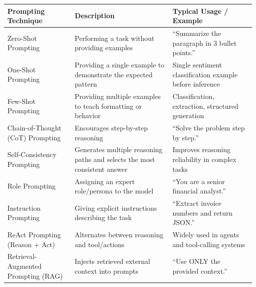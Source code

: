 \documentclass[10pt,a4paper]{article}
\begin{document}
\begin{table}[H]
\centering
\small
\begin{tabular}{|p{3.9cm}|p{6.2cm}|p{5cm}|}
\hline

\textbf{Prompting Technique} &
\textbf{Description} &
\textbf{Typical Usage / Example} \\

\hline

Zero-Shot Prompting &
Performing a task without providing examples &
``Summarize the paragraph in 3 bullet points.'' \\

\hline

One-Shot Prompting &
Providing a single example to demonstrate the expected pattern &
Single sentiment classification example before inference \\

\hline

Few-Shot Prompting &
Providing multiple examples to teach formatting or behavior &
Classification, extraction, structured generation \\

\hline

Chain-of-Thought (CoT) Prompting &
Encourages step-by-step reasoning &
``Solve the problem step by step.'' \\

\hline

Self-Consistency Prompting &
Generates multiple reasoning paths and selects the most consistent answer &
Improves reasoning reliability in complex tasks \\

\hline

Role Prompting &
Assigning an expert role/persona to the model &
``You are a senior financial analyst.'' \\

\hline

Instruction Prompting &
Giving explicit instructions describing the task &
``Extract invoice numbers and return JSON.'' \\

\hline

ReAct Prompting (Reason + Act) &
Alternates between reasoning and tool/actions &
Widely used in agents and tool-calling systems \\

\hline

Retrieval-Augmented Prompting (RAG) &
Injects retrieved external context into prompts &
``Use ONLY the provided context.'' \\


\end{tabular}
\end{table}
\end{document}
